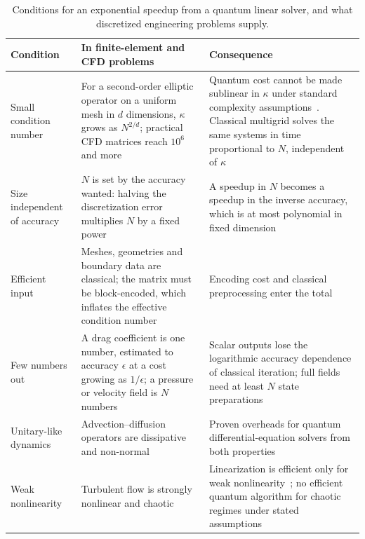 \begin{table}[htbp]
\centering\small
\caption{Conditions for an exponential speedup from a quantum linear solver, and what discretized engineering problems supply.}\label{tab:linreq}
\begin{tabular}{@{}L{3.0cm} L{6.0cm} L{6.8cm}@{}}
\toprule
Condition & In finite-element and CFD problems & Consequence\\\midrule
Small condition number & For a second-order elliptic operator on a uniform mesh in $d$ dimensions, $\kappa$ grows as $N^{2/d}$; practical CFD matrices reach $10^6$ and more~\cite{goldfriend2026} & Quantum cost cannot be made sublinear in $\kappa$ under standard complexity assumptions~\cite{hhl2009}. Classical multigrid solves the same systems in time proportional to $N$, independent of $\kappa$~\cite{brandt1977}\\
Size independent of accuracy & $N$ is set by the accuracy wanted: halving the discretization error multiplies $N$ by a fixed power & A speedup in $N$ becomes a speedup in the inverse accuracy, which is at most polynomial in fixed dimension~\cite{montanaro2016}\\
Efficient input & Meshes, geometries and boundary data are classical; the matrix must be block-encoded, which inflates the effective condition number~\cite{lapworth2025} & Encoding cost and classical preprocessing enter the total~\cite{lapworth2022}\\
Few numbers out & A drag coefficient is one number, estimated to accuracy $\epsilon$ at a cost growing as $1/\epsilon$; a pressure or velocity field is $N$ numbers & Scalar outputs lose the logarithmic accuracy dependence of classical iteration; full fields need at least $N$ state preparations\\
Unitary-like dynamics & Advection--diffusion operators are dissipative and non-normal & Proven overheads for quantum differential-equation solvers from both properties~\cite{an2025}\\
Weak nonlinearity & Turbulent flow is strongly nonlinear and chaotic & Linearization is efficient only for weak nonlinearity~\cite{liu2021c}; no efficient quantum algorithm for chaotic regimes under stated assumptions~\cite{lewis2024}\\
\bottomrule
\end{tabular}
\end{table}

